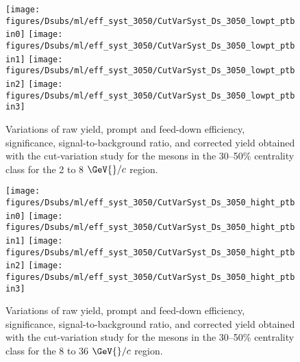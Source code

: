 \begin{figure}[!h]
  \begin{center}
    \texttt{[image: figures/Dsubs/ml/eff\_syst\_3050/CutVarSyst\_Ds\_3050\_lowpt\_ptbin0]}
    \texttt{[image: figures/Dsubs/ml/eff\_syst\_3050/CutVarSyst\_Ds\_3050\_lowpt\_ptbin1]}
    \texttt{[image: figures/Dsubs/ml/eff\_syst\_3050/CutVarSyst\_Ds\_3050\_lowpt\_ptbin2]}
    \texttt{[image: figures/Dsubs/ml/eff\_syst\_3050/CutVarSyst\_Ds\_3050\_lowpt\_ptbin3]}
    \caption{Variations of raw yield, prompt and feed-down \Dsubs{} efficiency, significance, signal-to-background ratio, 
            and corrected yield obtained with the cut-variation study for the \Dsubs{} mesons in the 30--50\% centrality class
            for the 2 to 8 \(\GeV{}/c\) \pt{} region.}
    \label{fig:DsCutSyst3050_ml_1}
  \end{center}
\end{figure}
\begin{figure}[!h]
  \begin{center}
    \texttt{[image: figures/Dsubs/ml/eff\_syst\_3050/CutVarSyst\_Ds\_3050\_hight\_ptbin0]}
    \texttt{[image: figures/Dsubs/ml/eff\_syst\_3050/CutVarSyst\_Ds\_3050\_hight\_ptbin1]}
    \texttt{[image: figures/Dsubs/ml/eff\_syst\_3050/CutVarSyst\_Ds\_3050\_hight\_ptbin2]}
    \texttt{[image: figures/Dsubs/ml/eff\_syst\_3050/CutVarSyst\_Ds\_3050\_hight\_ptbin3]}
    \caption{Variations of raw yield, prompt and feed-down \Dsubs{} efficiency, significance, signal-to-background ratio, 
            and corrected yield obtained with the cut-variation study for the \Dsubs{} mesons in the 30--50\% centrality class
            for the 8 to 36 \(\GeV{}/c\) \pt{} region.}
    \label{fig:DsCutSyst3050_ml_2}
  \end{center}
\end{figure}

